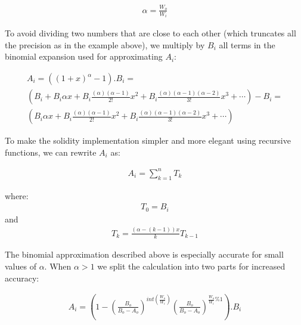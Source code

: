 \documentclass[11pt]{amsart}
\begin{document}
\begin{equation}
\begin{gathered}
\alpha = \frac{W_o}{W_i}
\end{gathered}
\end{equation}

To avoid dividing two numbers that are close to each other (which truncates all the precision as in the example above), we multiply by $B_i$ all terms in the binomial expansion used for approximating $A_i$:


\begin{equation}
\begin{gathered}
A_i=
\left(\left(1+x\right)^{\alpha}-1\right).B_i =
\\
\left(B_i + B_i\alpha x+
B_i\frac{(\alpha)(\alpha-1)}{2!}x^2+
B_i\frac{(\alpha)(\alpha-1)(\alpha-2)}{3!}x^3+
\cdots\right) - B_i =
\\
\left(B_i\alpha x+
B_i\frac{(\alpha)(\alpha-1)}{2!}x^2+
B_i\frac{(\alpha)(\alpha-1)(\alpha-2)}{3!}x^3+
\cdots \right)
\end{gathered}
\end{equation}

To make the solidity implementation simpler and more elegant using recursive functions, we can rewrite $A_i$ as:

\begin{equation}
\begin{gathered}
A_i = \sum_{k=1}^{n}T_k
\end{gathered}
\end{equation}


where:
\begin{equation}
\begin{gathered}
T_0 = B_i
\end{gathered}
\end{equation}
and
\begin{equation}
\begin{gathered}
T_k = \frac{\left(\alpha-(k-1)\right)x}{k} T_{k-1}
\end{gathered}
\end{equation}

The binomial approximation described above is especially accurate for small values of $\alpha$. When $\alpha>1$ we split the calculation into two parts for increased accuracy:

\begin{equation}
\begin{gathered}
A_i = \left(1 - \left(\frac{B_o}{B_o-A_o}\right)^{int\left(\frac{W_o}{W_i}\right)}\left(\frac{B_o}{B_o-A_o}\right)^{\frac{W_o}{W_i}\%1}\right).B_i
\end{gathered}
\end{equation}
\end{document}

